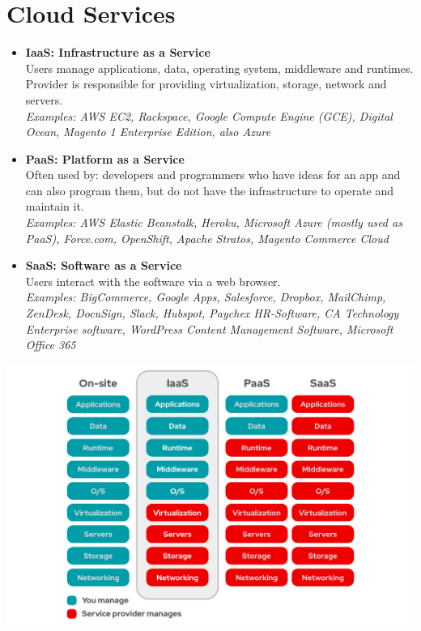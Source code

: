 \documentclass[12pt]{article}
\begin{document}
\thispagestyle{firstpage}

\section*{Cloud Services}
\begin{itemize}
    \item \textbf{IaaS: Infrastructure as a Service} \\
    Users manage applications, data, operating system, middleware and runtimes. \\
    Provider is responsible for providing virtualization, storage, network and servers. \\
    \textit{Examples: AWS EC2, Rackspace, Google Compute Engine (GCE), Digital Ocean, Magento 1 Enterprise Edition, also Azure}
    
    \item \textbf{PaaS: Platform as a Service} \\
    Often used by: developers and programmers who have ideas for an app and can also program them, but do not have the infrastructure to operate and maintain it. \\
    \textit{Examples: AWS Elastic Beanstalk, Heroku, Microsoft Azure (mostly used as PaaS), Force.com, OpenShift, Apache Stratos, Magento Commerce Cloud}
    
    \item \textbf{SaaS: Software as a Service} \\
    Users interact with the software via a web browser. \\
    \textit{Examples: BigCommerce, Google Apps, Salesforce, Dropbox, MailChimp, ZenDesk, DocuSign, Slack, Hubspot, Paychex HR-Software, CA Technology Enterprise software, WordPress Content Management Software, Microsoft Office 365}
\end{itemize}

\includegraphics[scale=0.3]{images/as-a-Service_comparison.png}
\end{document}
